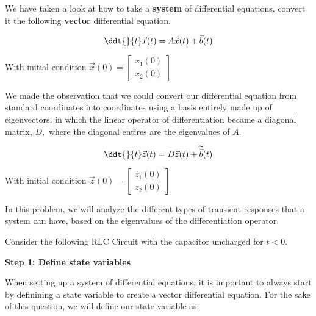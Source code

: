 

We have taken a look at how to take a \textbf{system} of differential equations, convert it the following \textbf{vector} differential equation.

\begin{equation}
\ddt{}{t} \vec{x}(t) = A \vec{x}(t) + \vec{b}(t)
\end{equation}

With initial condition $\vec{x}(0) = \begin{bmatrix} x_1(0) \\ x_2(0) \end{bmatrix}$

We made the observation that we could convert our differential equation from standard coordinates into coordinates using a basis entirely made up of eigenvectors, in which the linear operator of differentiation became a diagonal matrix, $D,$ where the diagonal entires are the eigenvalues of $A.$

\begin{equation}
\ddt{}{t} \vec{z}(t) = D \vec{z}(t) + \widetilde{\vec{b}}(t)
\end{equation}

With initial condition $\vec{z}(0) = \begin{bmatrix} z_1(0) \\ z_2(0) \end{bmatrix}$

In this problem, we will analyze the different types of transient responses that a system can have, based on the eigenvalues of the differentiation operator.

Consider the following RLC Circuit with the capacitor uncharged for $t < 0.$



\qitem \textbf{Step 1: Define state variables}


When setting up a system of differential equations, it is important to always start by definining a state variable to create a vector differential equation. For the sake of this question, we will define our state variable as:


